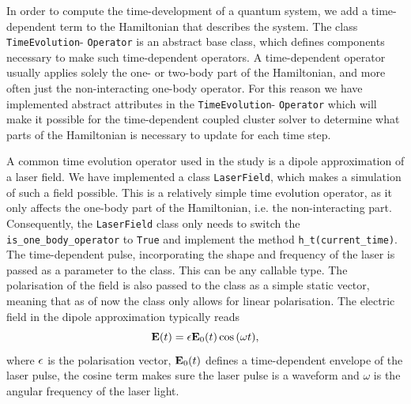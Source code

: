 In order to compute the time-development of a quantum system, we add a
time-dependent term to the Hamiltonian that describes the system. The class 
\lstinline{TimeEvolution}- \lstinline{Operator}
is an abstract base class, which defines
components necessary to make such time-dependent operators. A time-dependent 
operator usually applies solely the one- or two-body part of the Hamiltonian, and 
more often just the non-interacting one-body operator. For this reason we have implemented 
abstract attributes in the \lstinline{TimeEvolution}- \lstinline{Operator}
which will make it 
possible for the time-dependent coupled cluster solver to determine what parts 
of the Hamiltonian is necessary to update for each time step.

A common time evolution operator used in the study is a dipole approximation of 
a laser field. We have implemented a class \lstinline{LaserField}, which makes 
a simulation of such a field possible. This is a relatively simple time evolution 
operator, as it only affects the one-body part of the Hamiltonian, i.e. the 
non-interacting part. Consequently, the \lstinline{LaserField} class only needs 
to switch the \lstinline{is_one_body_operator} to \lstinline{True} and implement 
the method \lstinline{h_t(current_time)}. The time-dependent pulse, incorporating the 
shape and frequency of the laser is passed as a parameter to the class. This can be 
any callable type. The polarisation of the field is also passed to the class 
as a simple static vector, meaning that as of now the class only allows for 
linear polarisation. 
The electric field in the dipole approximation typically 
reads
\begin{equation}
    \vb{E}(t) = \vb{\epsilon} \vb{E}_0(t)\cos{(\omega t)},
\end{equation}
where $\vb{\epsilon}$ is the polarisation vector, $\vb{E}_0(t)$ defines a time-dependent 
envelope of the laser pulse, the cosine term makes sure the laser pulse is
a waveform and
$\omega$ is the angular frequency of the laser light.

\begin{figure}    

\end{figure}

\clearemptydoublepage